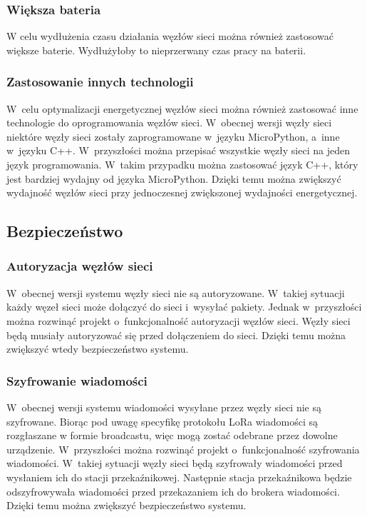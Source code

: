 \subsubsection*{Większa bateria}
W celu wydłużenia czasu działania węzłów sieci można również zastosować większe baterie. Wydłużyłoby to nieprzerwany czas pracy na baterii.

\subsubsection*{Zastosowanie innych technologii}
W~celu optymalizacji energetycznej węzłów sieci można również zastosować inne technologie do oprogramowania węzłów sieci.
W~obecnej wersji węzły sieci niektóre węzły sieci zostały zaprogramowane w~języku MicroPython, a~inne w~języku C++.
W~przyszłości można przepisać wszystkie węzły sieci na jeden język programowania.
W~takim przypadku można zastosować język C++, który jest bardziej wydajny od języka MicroPython.
Dzięki temu można zwiększyć wydajność węzłów sieci przy jednoczesnej zwiększonej wydajności energetycznej.

\subsection{Bezpieczeństwo}

\subsubsection{Autoryzacja węzłów sieci}
W~obecnej wersji systemu węzły sieci nie są autoryzowane.
W~takiej sytuacji każdy węzeł sieci może dołączyć do sieci i~wysyłać pakiety.
Jednak w~przyszłości można rozwinąć projekt o~funkcjonalność autoryzacji węzłów sieci.
Węzły sieci będą musiały autoryzować się przed dołączeniem do sieci.
Dzięki temu można zwiększyć wtedy bezpieczeństwo systemu.

\subsubsection{Szyfrowanie wiadomości}
W~obecnej wersji systemu wiadomości wysyłane przez węzły sieci nie są szyfrowane.
Biorąc pod uwagę specyfikę protokołu LoRa wiadomości są rozgłaszane w formie broadcastu, więc mogą zostać odebrane przez dowolne urządzenie.
W~przyszłości można rozwinąć projekt o~funkcjonalność szyfrowania wiadomości.
W~takiej sytuacji węzły sieci będą szyfrowały wiadomości przed wysłaniem ich do stacji przekaźnikowej.
Następnie stacja przekaźnikowa będzie odszyfrowywała wiadomości przed przekazaniem ich do brokera wiadomości.
Dzięki temu można zwiększyć bezpieczeństwo systemu.


